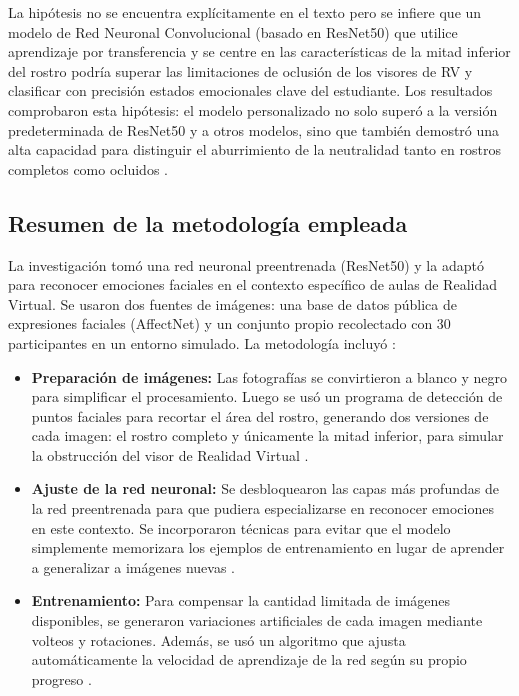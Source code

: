 La hipótesis no se encuentra explícitamente en el texto pero se infiere que un modelo de Red Neuronal Convolucional (basado en ResNet50) que utilice aprendizaje por transferencia y se centre en las características de la mitad inferior del rostro podría superar las limitaciones de oclusión de los visores de RV y clasificar con precisión estados emocionales clave del estudiante. Los resultados comprobaron esta hipótesis: el modelo personalizado no solo superó a la versión predeterminada de ResNet50 y a otros modelos, sino que también demostró una alta capacidad para distinguir el aburrimiento de la neutralidad tanto en rostros completos como ocluidos \cite{shomoye2024}.

\subsection{Resumen de la metodología empleada}
La investigación tomó una red neuronal preentrenada (ResNet50) y la adaptó para reconocer emociones faciales en el contexto específico de aulas de Realidad Virtual. Se usaron dos fuentes de imágenes: una base de datos pública de expresiones faciales (AffectNet) y un conjunto propio recolectado con 30 participantes en un entorno simulado. La metodología incluyó \cite{shomoye2024}:

\begin{itemize}
    \item \textbf{Preparación de imágenes:} Las fotografías se convirtieron a blanco y negro para simplificar el procesamiento. Luego se usó un programa de detección de puntos faciales para recortar el área del rostro, generando dos versiones de cada imagen: el rostro completo y únicamente la mitad inferior, para simular la obstrucción del visor de Realidad Virtual \cite{shomoye2024}.
    \item \textbf{Ajuste de la red neuronal:} Se desbloquearon las capas más profundas de la red preentrenada para que pudiera especializarse en reconocer emociones en este contexto. Se incorporaron técnicas para evitar que el modelo simplemente memorizara los ejemplos de entrenamiento en lugar de aprender a generalizar a imágenes nuevas \cite{shomoye2024}.
    \item \textbf{Entrenamiento:} Para compensar la cantidad limitada de imágenes disponibles, se generaron variaciones artificiales de cada imagen mediante volteos y rotaciones. Además, se usó un algoritmo que ajusta automáticamente la velocidad de aprendizaje de la red según su propio progreso \cite{shomoye2024}.
\end{itemize}

